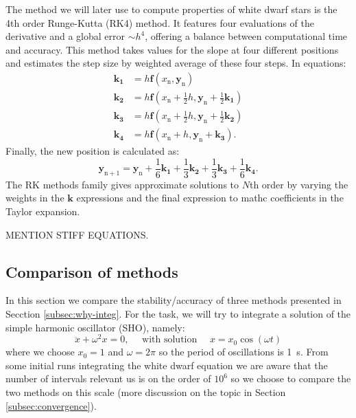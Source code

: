 \documentclass[]{article}
\renewcommand{\vec}[1]{\boldsymbol{#1}}
\begin{document}
	The method we will later use to compute properties of white dwarf stars is the 4th order Runge-Kutta (RK4) method. It features four evaluations of the derivative and a global error $\sim h^4$, offering a balance between computational time and accuracy. This method takes values for the slope at four different positions and estimates the step size by weighted average of these four steps. In equations:
	\begin{align*}
		\vec{k_1} &= h \vec{f}(x_\mathrm{n}, \vec{y}_\mathrm{n})\\
		\vec{k_2} &= h \vec{f}\left(x_\mathrm{n} + \frac{1}{2} h, \vec{y}_\mathrm{n} + \frac{1}{2}\vec{k_1}\right)\\
		\vec{k_3} &= h \vec{f}\left(x_\mathrm{n} + \frac{1}{2} h, \vec{y}_\mathrm{n} + \frac{1}{2}\vec{k_2}\right)\\
		\vec{k_4} &= h \vec{f}(x_\mathrm{n} + h, \vec{y}_\mathrm{n} + \vec{k_3}).
	\end{align*}
	Finally, the new position is calculated as:
	\begin{equation}
		\vec{y}_\mathrm{n+1} = \vec{y}_\mathrm{n} + \frac{1}{6} \vec{k_1} + \frac{1}{3} \vec{k_2} + \frac{1}{3} \vec{k_3} + \frac{1}{6} \vec{k_4}.
	\end{equation}
	The RK methods family gives approximate solutions to $N$th order by varying the weights in the $\vec{k}$ expressions and the final expression to mathc coefficients in the Taylor expansion.

	{\color{red} MENTION STIFF EQUATIONS.}

\subsection{Comparison of methods}
	In this section we compare the stability/accuracy of three methods presented in Secction \ref{subsec:why-integ}. For the task, we will try to integrate a solution of the simple harmonic oscillator (SHO), namely:
	\begin{equation}
		\ddot{x} + \omega^2 x = 0, \quad \text{ with solution } \quad x = x_0 \cos(\omega t)
	\end{equation}
	where we choose $x_0 = 1$ and $\omega = 2 \pi$ so the period of oscillations is \SI{1}{s}. From some initial runs integrating the white  dwarf equation we are aware that the number of intervals relevant us is on the order of $10^{6}$ so we choose to compare the two methods on this scale (more discussion on the topic in Section \ref{subsec:convergence}).
\end{document}
